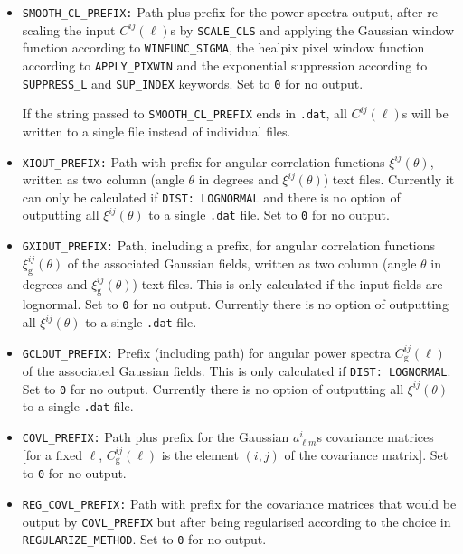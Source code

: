\documentclass[12pt]{book} %
\newcommand{\nv}[1]{\mathrm{#1}}                 %
\begin{document}
\begin{itemize}
\item {\tt SMOOTH\_CL\_PREFIX:} Path plus prefix for the power spectra output, after re-scaling 
  the input $C^{ij}(\ell)$s by {\tt SCALE\_CLS} and applying the Gaussian window function according to 
  {\tt WINFUNC\_SIGMA}, the {\sc healpix} pixel window function according to {\tt APPLY\_PIXWIN} 
  and the exponential suppression according to {\tt SUPPRESS\_L} and {\tt SUP\_INDEX} 
  keywords. Set to {\tt 0} for no output.

  If the string passed to {\tt SMOOTH\_CL\_PREFIX} ends in {\tt .dat}, all $C^{ij}(\ell)$s will 
  be written to a single file instead of individual files. 

\item {\tt XIOUT\_PREFIX:} Path with prefix for angular correlation functions $\xi^{ij}(\theta)$, 
  written as two column (angle $\theta$ in degrees and $\xi^{ij}(\theta)$) text files. 
  Currently it can only be calculated if {\tt DIST: LOGNORMAL} and there is no option of 
  outputting all $\xi^{ij}(\theta)$ to a single {\tt .dat} file. Set to {\tt 0} for no output. 
  

\item {\tt GXIOUT\_PREFIX:} Path, including a prefix, for angular correlation functions 
  $\xi^{ij}_{\nv{g}}(\theta)$ of the associated Gaussian fields, written as two column 
  (angle $\theta$ in degrees and $\xi^{ij}_{\nv{g}}(\theta)$) text files. This is only calculated if the 
  input fields are lognormal. Set to {\tt 0} for no output. Currently there is no option of 
  outputting all $\xi^{ij}(\theta)$ to a single {\tt .dat} file.

\item {\tt GCLOUT\_PREFIX:} Prefix (including path) for angular power spectra $C_{\nv{g}}^{ij}(\ell)$ 
  of the associated Gaussian fields. This is only calculated if {\tt DIST: LOGNORMAL}. 
  Set to {\tt 0} for no output. Currently there is no option of 
  outputting all $\xi^{ij}(\theta)$ to a single {\tt .dat} file.

\item {\tt COVL\_PREFIX:} Path plus prefix for the Gaussian $a^{i}_{\ell m}$s covariance matrices 
  [for a fixed $\ell$, $C_{\nv{g}}^{ij}(\ell)$ is the element $(i,j)$ of the covariance matrix]. 
  Set to {\tt 0} for no output.

\item {\tt REG\_COVL\_PREFIX:} Path with prefix for the covariance matrices that would be output 
  by {\tt COVL\_PREFIX} but after being regularised according to the choice in {\tt REGULARIZE\_METHOD}.
  Set to {\tt 0} for no output.


\end{itemize}
\end{document}
